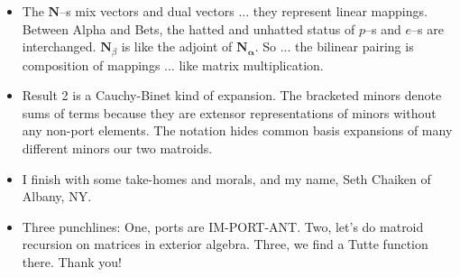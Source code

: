\documentclass[14pt]{extarticle}
\begin{document}
{\begin{itemize}
\item
  The $\mathbf{N}$--s mix vectors and dual vectors ... they represent linear mappings.
  Between Alpha and Bets, the hatted and unhatted status of $p$--s and $e$--s are interchanged.
  $\mathbf{N}_\beta$ is like the adjoint of $\mathbf{N_\alpha}$.  So ... the
  bilinear pairing is composition of mappings  ... like matrix multiplication.

\item
  Result 2 is a Cauchy-Binet kind of expansion. The bracketed minors denote sums of terms
  because they are extensor representations of minors without any non-port elements.
  The notation hides common basis expansions of many different minors our two matroids.


\item
  I finish with some take-homes and morals, and my name, Seth Chaiken
  of Albany, NY.

  \item
  Three punchlines:  One, ports are IM-PORT-ANT.
  Two, let's do matroid recursion on matrices in exterior algebra.
  Three, we find a Tutte function there.
  Thank you!
  \end{itemize}
}
\end{document}
